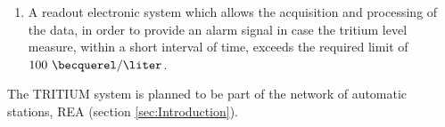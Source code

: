 \begin{enumerate}
\item{} A readout electronic system which allows the acquisition and processing of the data, in order to provide an alarm signal in case the tritium level measure, within a short interval of time, exceeds the required limit of $100~\becquerel/\liter$.

\end{enumerate}

The TRITIUM system is planned to be part of the network of automatic stations, REA (section \ref{sec:Introduction}).